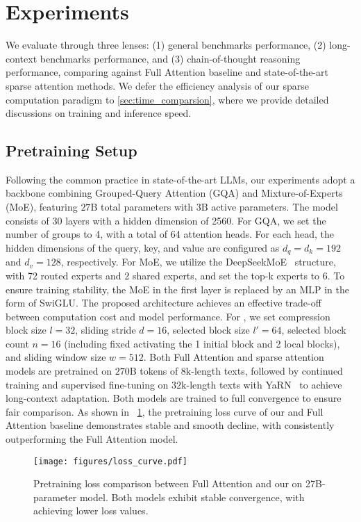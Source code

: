 \section{Experiments}
\label{sec:experiment}
We evaluate \method{} through three lenses: (1) general benchmarks performance, (2) long-context benchmarks performance, and (3) chain-of-thought reasoning performance, comparing against Full Attention baseline and state-of-the-art sparse attention methods. We defer the efficiency analysis of our sparse computation paradigm to \cref{sec:time_comparsion}, where we provide detailed discussions on training and inference speed.

\subsection{Pretraining Setup} 
Following the common practice in state-of-the-art LLMs, our experiments adopt a backbone combining Grouped-Query Attention (GQA) and Mixture-of-Experts (MoE), featuring $27\text{B}$ total parameters with $3\text{B}$ active parameters. The model consists of 30 layers with a hidden dimension of 2560. For GQA, we set the number of groups to 4, with a total of 64 attention heads. For each head, the hidden dimensions of the query, key, and value are configured as $d_q = d_k = 192$ and $d_v = 128$, respectively. For MoE, we utilize the DeepSeekMoE~\citep{dai2024deepseekmoe,deepseekV2} structure, with 72 routed experts and 2 shared experts, and set the top-k experts to 6. To ensure training stability, the MoE in the first layer is replaced by an MLP in the form of SwiGLU. The proposed architecture achieves an effective trade-off between computation cost and model performance.
For \method{}, we set compression block size $l=32$, sliding stride $d=16$, selected block size $l'=64$, selected block count $n=16$ (including fixed activating the 1 initial block and 2 local blocks), and sliding window size $w=512$. Both Full Attention and sparse attention models are pretrained on $270\text{B}$ tokens of $8\text{k}$-length texts, followed by continued training and supervised fine-tuning on $32\text{k}$-length texts with YaRN~\citep{yarn} to achieve long-context adaptation. Both models are trained to full convergence to ensure fair comparison. As shown in ~\cref{fig:losscurve}, the pretraining loss curve of our \method{} and Full Attention baseline demonstrates stable and smooth decline, with \method{} consistently outperforming the Full Attention model.
\begin{figure}[t]
    \centering
    \texttt{[image: figures/loss\_curve.pdf]}
    \caption{Pretraining loss comparison between Full Attention and our \method{} on 27B-parameter model. Both models exhibit stable convergence, with \method{} achieving lower loss values.}
    
    \label{fig:losscurve}
\end{figure}


